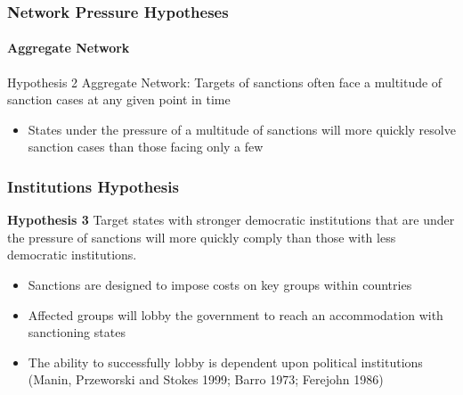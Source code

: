 \begin{frame}
\frametitle{Network Pressure Hypotheses}
\framesubtitle{Aggregate Network}

\begin{block}{Hypothesis 2}
	Aggregate Network: Targets of sanctions often face a multitude of sanction cases at any given point in time
\end{block}

\begin{itemize}
	\item States under the pressure of a multitude of sanctions will more quickly resolve sanction cases than those facing only a few
\end{itemize}

\end{frame}

\begin{frame}
\frametitle{Institutions Hypothesis}

\begin{block}{\textbf{Hypothesis 3}}
	Target states with stronger democratic institutions that are under the pressure of sanctions will more quickly comply than those with less democratic institutions. 
\end{block}

\begin{itemize}
	\item Sanctions are designed to impose costs on key groups within countries
	\item Affected groups will lobby the government to reach an accommodation with sanctioning states
	\item The ability to successfully lobby is dependent upon political institutions (Manin, Przeworski and Stokes 1999; Barro 1973; Ferejohn 1986)
\end{itemize}

\end{frame}

